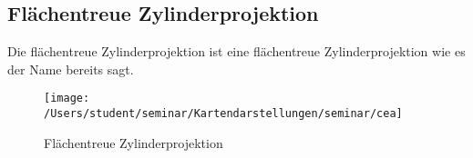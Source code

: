 \subsection{Flächentreue Zylinderprojektion}
\label{sec:equareazyl}
Die flächentreue Zylinderprojektion ist eine flächentreue Zylinderprojektion wie es der Name bereits sagt. \\

\begin{figure}[hbtp]
\centering
\texttt{[image: /Users/student/seminar/Kartendarstellungen/seminar/cea]} \caption{Flächentreue Zylinderprojektion}
\end{figure}
\newpage 